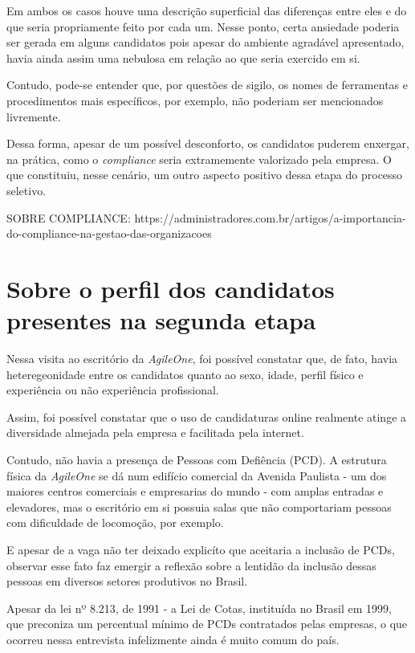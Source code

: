 \documentclass[12pt]{article}
\begin{document}
Em ambos os casos houve uma descrição superficial das diferenças entre eles e do que seria propriamente feito por cada um. Nesse ponto, certa ansiedade poderia ser gerada em alguns candidatos pois apesar do ambiente agradável apresentado, havia ainda assim uma nebulosa em relação ao que seria exercido em si. 

Contudo, pode-se entender que, por questões de sigilo, os nomes de ferramentas e procedimentos mais específicos, por exemplo, não poderiam ser mencionados livremente. 

Dessa forma, apesar de um possível desconforto, os candidatos puderem enxergar, na prática, como o \emph{compliance} seria extramemente valorizado pela empresa. O que constituiu, nesse cenário, um outro aspecto positivo dessa etapa do processo seletivo.

SOBRE COMPLIANCE: https://administradores.com.br/artigos/a-importancia-do-compliance-na-gestao-das-organizacoes

\section*{Sobre o perfil dos candidatos presentes na segunda etapa}

Nessa visita ao escritório da \textit{AgileOne}, foi possível constatar que, de fato, havia heteregeonidade entre os candidatos quanto ao sexo, idade, perfil físico e experiência ou não experiência profissional. 

Assim, foi possível constatar que o uso de candidaturas online realmente atinge a diversidade almejada pela empresa e facilitada pela internet. 

Contudo, não havia a presença de Pessoas com Defiência (PCD). A estrutura física da \emph {AgileOne} se dá num edifício comercial da Avenida Paulista - um dos maiores centros comerciais e empresarias do mundo  - com amplas entradas e elevadores, mas o escritório em si possuia salas que não comportariam pessoas com dificuldade de locomoção, por exemplo. 

E apesar de a vaga não ter deixado explicíto que aceitaria a inclusão de PCDs, observar esse fato faz emergir a reflexão sobre a lentidão da  inclusão dessas pessoas em diversos setores produtivos no  Brasil.

Apesar da  lei nº 8.213, de 1991 -  a Lei de Cotas, instituída no Brasil em 1999, que preconiza  um percentual mínimo de PCDs contratados pelas empresas,  o que ocorreu nessa entrevista infelizmente ainda é muito comum do país.
\end{document}
